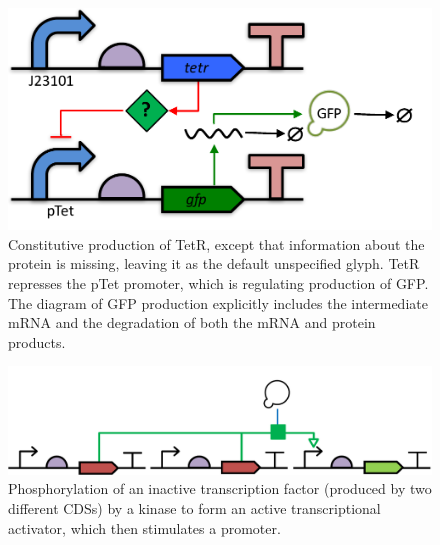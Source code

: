 \begin{figure}[h!]
\includegraphics[scale=0.5]{figures/apdx-examples/apdx-exa13.pdf}
\caption{Constitutive production of TetR, except that information about the protein is missing, leaving it as the default unspecified glyph. TetR represses the pTet promoter, which is regulating production of GFP.  The diagram of GFP production explicitly includes the intermediate mRNA and the degradation of both the mRNA and protein products.}
\label{f:apdx:exa13}
\end{figure}

\begin{figure}[h!]
\includegraphics[scale=0.5]{figures/apdx-examples/apdx-exa14.pdf}
\caption{Phosphorylation of an inactive transcription factor (produced by two different CDSs) by a kinase to form an active transcriptional activator, which then stimulates a promoter.}
\label{f:apdx:exa14}
\end{figure}




